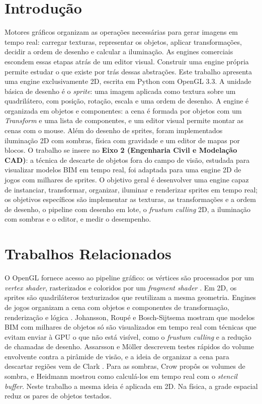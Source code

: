 \documentclass[conference]{IEEEtran}
\begin{document}
\section{Introdução}
Motores gráficos organizam as operações necessárias para gerar imagens em tempo real: carregar texturas, representar os objetos, aplicar transformações, decidir a ordem de desenho e calcular a iluminação. As engines comerciais escondem essas etapas atrás de um editor visual. Construir uma engine própria permite estudar o que existe por trás dessas abstrações.
Este trabalho apresenta uma engine exclusivamente 2D, escrita em Python com OpenGL 3.3. A unidade básica de desenho é o \textit{sprite}: uma imagem aplicada como textura sobre um quadrilátero, com posição, rotação, escala e uma ordem de desenho. A engine é organizada em objetos e componentes: a cena é formada por objetos com um \textit{Transform} e uma lista de componentes, e um editor visual permite montar as cenas com o mouse. Além do desenho de sprites, foram implementados iluminação 2D com sombras, física com gravidade e um editor de mapas por blocos.
O trabalho se insere no \textbf{Eixo 2 (Engenharia Civil e Modelação CAD)}: a técnica de descarte de objetos fora do campo de visão, estudada para visualizar modelos BIM em tempo real, foi adaptada para uma engine 2D de jogos com milhares de sprites. O objetivo geral é desenvolver uma engine capaz de instanciar, transformar, organizar, iluminar e renderizar sprites em tempo real; os objetivos específicos são implementar as texturas, as transformações e a ordem de desenho, o pipeline com desenho em lote, o \textit{frustum culling} 2D, a iluminação com sombras e o editor, e medir o desempenho.

\section{Trabalhos Relacionados}
O OpenGL fornece acesso ao pipeline gráfico: os vértices são processados por um \textit{vertex shader}, rasterizados e coloridos por um \textit{fragment shader} \cite{segal2010,akenine2018}. Em 2D, os sprites são quadriláteros texturizados que reutilizam a mesma geometria. Engines de jogos organizam a cena com objetos e componentes de transformação, renderização e lógica \cite{gregory2018}.
Johansson, Roupé e Bosch-Sijtsema \cite{johansson2015} mostram que modelos BIM com milhares de objetos só são visualizados em tempo real com técnicas que evitam enviar à GPU o que não está visível, como o \textit{frustum culling} e a redução de chamadas de desenho. Assarsson e Möller \cite{assarsson2000} descrevem testes rápidos do volume envolvente contra a pirâmide de visão, e a ideia de organizar a cena para descartar regiões vem de Clark \cite{clark1976}.
Para as sombras, Crow \cite{crow1977} propôs os volumes de sombra, e Heidmann \cite{heidmann1991} mostrou como calculá-los em tempo real com o \textit{stencil buffer}. Neste trabalho a mesma ideia é aplicada em 2D. Na física, a grade espacial \cite{teschner2003,ericson2005} reduz os pares de objetos testados.
\end{document}
